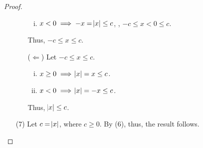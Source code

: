 \documentclass[11pt,openany]{article}
\begin{document}
\begin{proof}
\begin{enumerate}[(1)]
\begin{itemize}
\begin{enumerate}[(i)]
			\item $x<0\implies -x=\abs{x}\leq c$, \ie, $-c\leq x< 0\leq c$.
		\end{enumerate} Thus, $-c\leq x\leq c$.
		\vspace{.5cm}
		\item[($\Leftarrow$)] Let $-c\leq x\leq c$. \begin{enumerate}[(i)]
			\item $x\geq 0\implies \abs{x}=x\leq c$.
			\item $x<0\implies \abs{x}=-x\leq c$.
		\end{enumerate} Thus, $\abs{x}\leq c$.
	\end{itemize}
	\item[(7)] Let $c=\abs{x}$, where $c\geq 0$. By (6), thus, the result follows.
\end{enumerate}
\end{proof}
\vfill
{}
\end{document}
